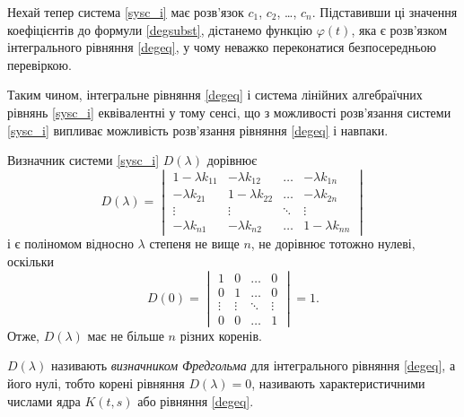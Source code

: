 \documentclass[14pt,twoside]{extreport}
\theoremstyle{mystyle}
\numberwithin{equation}{chapter}
\begin{document}
Нехай тепер система \eqref{sysc_i} має розв'язок $c_1$, $c_2$, \ldots, $c_n$. Підставивши ці значення коефіцієнтів до формули \eqref{degsubst}, дістанемо функцію $\varphi(t)$, яка є розв'язком інтегрального рівняння \eqref{degeq}, у чому неважко переконатися безпосередньою перевіркою.

Таким чином, інтегральне рівняння \eqref{degeq} і система лінійних алгебраїчних рівнянь \eqref{sysc_i} еквівалентні у тому сенсі, що з можливості розв'язання системи \eqref{sysc_i} випливає можливість розв'язання рівняння \eqref{degeq} і навпаки.

Визначник системи \eqref{sysc_i} $D(\lambda)$ дорівнює
\begin{equation}
D(\lambda)=
\begin{vmatrix}
1-\lambda k_{11} & -\lambda k_{12} & \ldots & -\lambda k_{1n}\\
-\lambda k_{21} & 1-\lambda k_{22} & \ldots & -\lambda k_{2n}\\
\vdots & \vdots & \ddots & \vdots \\
-\lambda k_{n1} & -\lambda k_{n2} & \ldots & 1-\lambda k_{nn}
\end{vmatrix}
\end{equation}
і є поліномом відносно $\lambda$ степеня не вище $n$, не дорівнює тотожно нулеві, оскільки
\begin{equation}
D(0)=
\begin{vmatrix}
1 & 0 & \ldots & 0\\
0 & 1 & \ldots & 0\\
\vdots & \vdots & \ddots & \vdots \\
0 & 0 & \ldots & 1
\end{vmatrix}=1.
\end{equation}
Отже, $D(\lambda)$ має не більше $n$ різних коренів.

$D(\lambda)$ називають \emph{визначником Фредгольма} для інтегрального рівняння \eqref{degeq}, а його нулі, тобто корені рівняння $D(\lambda)=0$, називають характеристичними числами ядра $K(t, s)$ або рівняння \eqref{degeq}.
\end{document}
